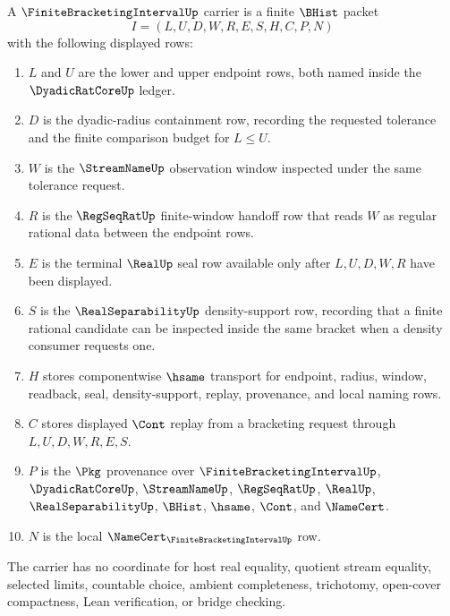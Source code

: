 \begin{definition}
\label{def:finite-bracketing-interval-carrier}
A $\FiniteBracketingIntervalUp$ carrier is a finite $\BHist$ packet
$$
I=(L,U,D,W,R,E,S,H,C,P,N)
$$
with the following displayed rows:
\begin{enumerate}
\item $L$ and $U$ are the lower and upper endpoint rows, both named inside the $\DyadicRatCoreUp$ ledger.
\item $D$ is the dyadic-radius containment row, recording the requested tolerance and the finite comparison budget for $L \leq U$.
\item $W$ is the $\StreamNameUp$ observation window inspected under the same tolerance request.
\item $R$ is the $\RegSeqRatUp$ finite-window handoff row that reads $W$ as regular rational data between the endpoint rows.
\item $E$ is the terminal $\RealUp$ seal row available only after $L,U,D,W,R$ have been displayed.
\item $S$ is the $\RealSeparabilityUp$ density-support row, recording that a finite rational candidate can be inspected inside the same bracket when a density consumer requests one.
\item $H$ stores componentwise $\hsame$ transport for endpoint, radius, window, readback, seal, density-support, replay, provenance, and local naming rows.
\item $C$ stores displayed $\Cont$ replay from a bracketing request through $L,U,D,W,R,E,S$.
\item $P$ is the $\Pkg$ provenance over $\FiniteBracketingIntervalUp$, $\DyadicRatCoreUp$, $\StreamNameUp$, $\RegSeqRatUp$, $\RealUp$, $\RealSeparabilityUp$, $\BHist$, $\hsame$, $\Cont$, and $\NameCert$.
\item $N$ is the local $\NameCert_{\FiniteBracketingIntervalUp}$ row.
\end{enumerate}
The carrier has no coordinate for host real equality, quotient stream equality, selected limits, countable choice, ambient completeness, trichotomy, open-cover compactness, Lean verification, or bridge checking.
\end{definition}

